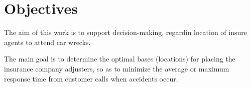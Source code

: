 \section{Objectives}
The aim of this work
is to support decision-making,
regardin location of insure agents
to attend car wrecks.

The main goal is
to determine the optimal bases (locations)
for placing the insurance company adjusters,
so as to minimize
the average or maximum response time
from customer calls
when accidents occur.
